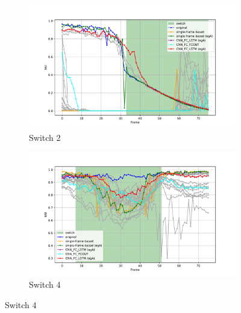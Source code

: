 \begin{figure}[H]
    \centering
    \begin{subfigure}[b]{0.49\textwidth}
        \centering
        \includegraphics[width=\textwidth]{PICs/experiments/temporalModels/plot_ious_sequence_2.pdf}
        \caption{Switch 2}
        \label{fig:IoUTrends_switch_2}
    \end{subfigure}
    \begin{subfigure}[b]{0.49\textwidth}
        \centering
        \includegraphics[width=\textwidth]{PICs/experiments/temporalModels/plot_ious_sequence_4.pdf}
        \caption{Switch 4}
        \label{fig:IoUTrends_switch_4}
    \end{subfigure}

    \vspace{1em} %


\end{figure}
